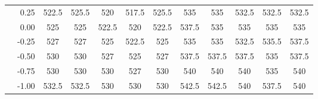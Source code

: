 \begin{tabular}{l | r | ccccc || ccccc}
    & 0.25  & \cellcolor{white!52!gray}522.5  & \cellcolor{white!36!gray}525.5  & \cellcolor{white!60!gray}520    & \cellcolor{white!68!gray}517.5  & \cellcolor{white!36!gray}525.5  & \cellcolor{white!45!orange}535    & \cellcolor{white!45!orange}535    & \cellcolor{white!56!orange}532.5  & \cellcolor{white!56!orange}532.5  & \cellcolor{white!56!orange}532.5  \\
    & 0.00  & \cellcolor{white!44!gray}525    & \cellcolor{white!44!gray}525    & \cellcolor{white!52!gray}522.5  & \cellcolor{white!60!gray}520    & \cellcolor{white!52!gray}522.5  & \cellcolor{white!23!orange}537.5  & \cellcolor{white!45!orange}535    & \cellcolor{white!45!orange}535    & \cellcolor{white!45!orange}535    & \cellcolor{white!45!orange}535    \\
    & -0.25 & \cellcolor{white!28!gray}527    & \cellcolor{white!20!gray}527    & \cellcolor{white!44!gray}525    & \cellcolor{white!52!gray}522.5  & \cellcolor{white!44!gray}525    & \cellcolor{white!45!orange}535    & \cellcolor{white!45!orange}535    & \cellcolor{white!56!orange}532.5  & \cellcolor{white!34!orange}535.5  & \cellcolor{white!23!orange}537.5  \\
    & -0.50  & \cellcolor{white!12!gray}530    & \cellcolor{white!12!gray}530    & \cellcolor{white!20!gray}527    & \cellcolor{white!44!gray}525    & \cellcolor{white!20!gray}527    & \cellcolor{white!23!orange}537.5  & \cellcolor{white!23!orange}537.5  & \cellcolor{white!23!orange}537.5  & \cellcolor{white!45!orange}535    & \cellcolor{white!23!orange}537.5  \\
    & -0.75 & \cellcolor{white!12!gray}530    & \cellcolor{white!12!gray}530    & \cellcolor{white!12!gray}530    & \cellcolor{white!20!gray}527    & \cellcolor{white!12!gray}530    & \cellcolor{white!12!orange}540    & \cellcolor{white!12!orange}540    & \cellcolor{white!12!orange}540    & \cellcolor{white!45!orange}535    & \cellcolor{white!12!orange}540    \\
    & -1.00 & \cellcolor{white!8!gray}532.5   & \cellcolor{white!8!gray}532.5   & \cellcolor{white!12!gray}530    & \cellcolor{white!12!gray}530    & \cellcolor{white!12!gray}530    & \cellcolor{white!1!orange}542.5   & \cellcolor{white!1!orange}542.5   & \cellcolor{white!12!orange}540    & \cellcolor{white!23!orange}537.5  & \cellcolor{white!12!orange}540    \\
\hline\hline
\end{tabular}
